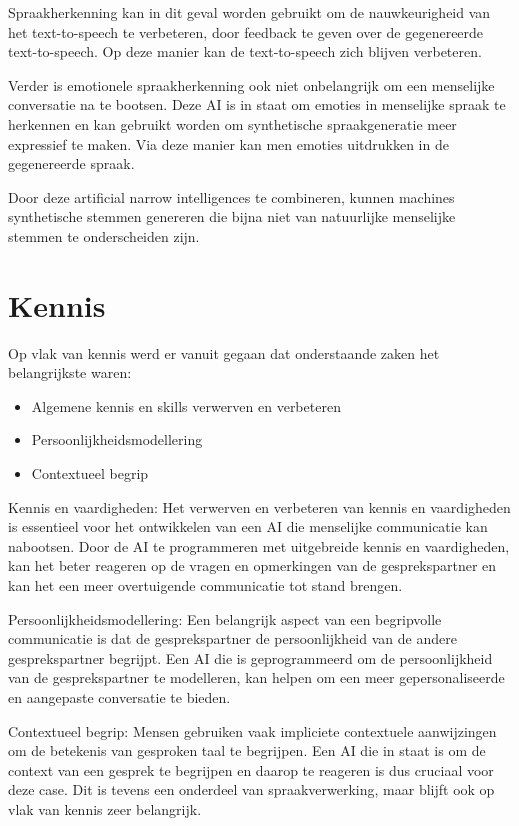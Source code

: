 Spraakherkenning kan in dit geval worden gebruikt om de nauwkeurigheid van het text-to-speech te verbeteren, door feedback te geven over de gegenereerde text-to-speech. Op deze manier kan de text-to-speech zich blijven verbeteren.

Verder is emotionele spraakherkenning ook niet onbelangrijk om een menselijke conversatie na te bootsen. Deze AI is in staat om emoties in menselijke spraak te herkennen en kan gebruikt worden om synthetische spraakgeneratie meer expressief te maken. Via deze manier kan men emoties uitdrukken in de gegenereerde spraak.

Door deze artificial narrow intelligences te combineren, kunnen machines synthetische stemmen genereren die bijna niet van natuurlijke menselijke stemmen te onderscheiden zijn.

\newpage

\section{Kennis}

Op vlak van kennis werd er vanuit gegaan dat onderstaande zaken het belangrijkste waren:

\begin{itemize}
    \item Algemene kennis en skills verwerven en verbeteren
    \item Persoonlijkheidsmodellering
    \item Contextueel begrip
\end{itemize}

Kennis en vaardigheden: Het verwerven en verbeteren van kennis en vaardigheden is essentieel voor het ontwikkelen van een AI die menselijke communicatie kan nabootsen. Door de AI te programmeren met uitgebreide kennis en vaardigheden, kan het beter reageren op de vragen en opmerkingen van de gesprekspartner en kan het een meer overtuigende communicatie tot stand brengen.

Persoonlijkheidsmodellering: Een belangrijk aspect van een begripvolle communicatie is dat de gesprekspartner de persoonlijkheid van de andere gesprekspartner begrijpt. Een AI die is geprogrammeerd om de persoonlijkheid van de gesprekspartner te modelleren, kan helpen om een meer gepersonaliseerde en aangepaste conversatie te bieden.

Contextueel begrip: Mensen gebruiken vaak impliciete contextuele aanwijzingen om de betekenis van gesproken taal te begrijpen. Een AI die in staat is om de context van een gesprek te begrijpen en daarop te reageren is dus cruciaal voor deze case. Dit is tevens een onderdeel van spraakverwerking, maar blijft ook op vlak van kennis zeer belangrijk.

